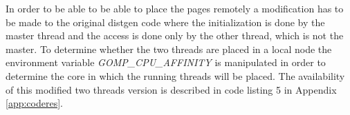 In order to be able to be able to place the pages remotely a modification has to be made to the original distgen code where the initialization is done by the master thread and the access is done only by the other thread, which is not the master. To determine whether the two threads are placed in a local node the environment variable \textit{GOMP\_CPU\_AFFINITY} is manipulated in order to determine the core in which the running threads will be placed. The availability of this modified two threads version is described in code listing 5 in Appendix \ref{app:coderes}.

